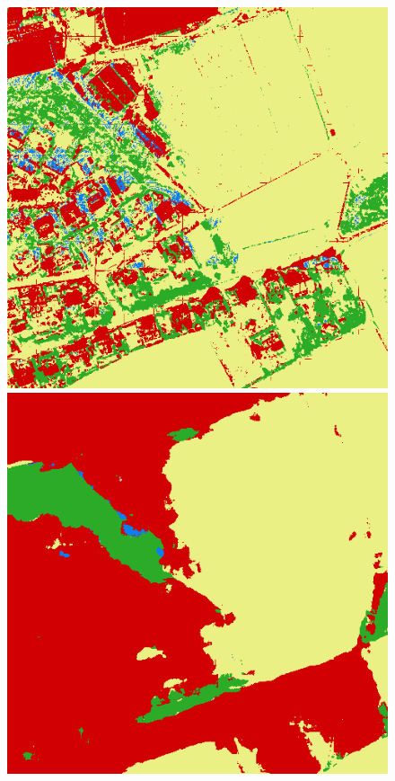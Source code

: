 {\begin{figure}
    \includegraphics[width=\DiscussionImageWidth]{images/segmentation_discussion/densenet/716.png} \hfill
    \includegraphics[width=\DiscussionImageWidth]{images/segmentation_discussion/unet/716.png}


\end{figure}}
